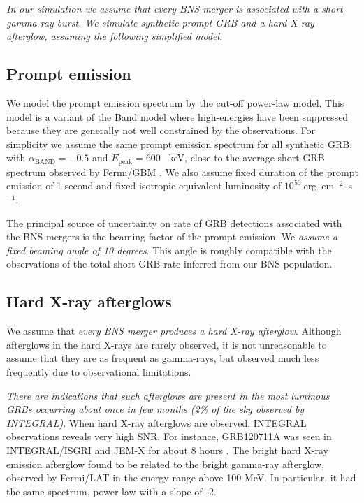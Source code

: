 \documentclass[12pt, a4]{article}
\begin{document}
\emph{In our simulation we assume that every BNS merger is associated with a short
gamma-ray burst. We simulate synthetic prompt GRB and a hard X-ray afterglow,
assuming the following simplified model.}

\subsection*{Prompt emission}
We model the prompt emission spectrum by the cut-off power-law model. This
model is a variant of the Band model \cite{band93} where high-energies have
been suppressed because they are generally not well constrained by the
observations. For simplicity we assume the same prompt emission spectrum
for all synthetic GRB, with $\alpha_{\mathrm{BAND}} = - 0.5$ and
$E_{\mathrm{peak}} = 600$ \, keV, close to the average short GRB spectrum
observed by Fermi/GBM \cite{gruber14}.  
We also assume
fixed duration of the prompt emission of 1 second and fixed isotropic equivalent
luminosity of $10^{50}~$erg~cm$^{-2}$~s$^{-1}$.

The principal source of uncertainty on rate of GRB detections associated with
the BNS mergers is the beaming factor of the prompt emission. We \emph{assume a fixed
beaming angle of 10 degrees}. This angle is roughly compatible with the
observations of the total short GRB rate inferred from our BNS population.

\subsection*{Hard X-ray afterglows}

We assume that \emph{every BNS merger produces a hard X-ray afterglow}. Although
afterglows in the hard X-rays are rarely observed, it is not unreasonable to
assume that they are as frequent as gamma-rays, but observed much less
frequently due to observational limitations.

\emph{There are indications that such afterglows are present in the most luminous GRBs
occurring about once in few months (2\% of the sky observed by INTEGRAL)}.  When
hard X-ray afterglows are observed, INTEGRAL observations reveals very high
SNR. For instance, GRB120711A was seen in INTEGRAL/ISGRI and JEM-X for about 8
hours \cite{martin-carrillo14:_grb}. The bright hard X-ray emission afterglow found to
be related to the bright gamma-ray afterglow, observed by Fermi/LAT in the
energy range above 100 MeV. In particular, it had the same spectrum, power-law
with a slope of -2.
\end{document}
